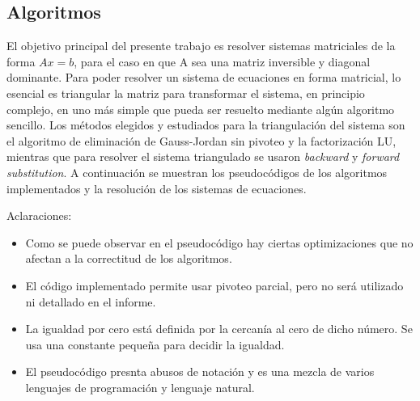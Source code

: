 \subsection{Algoritmos}

El objetivo principal del presente trabajo es resolver sistemas matriciales de la forma $Ax = b$, para el caso en que A sea una matriz inversible y diagonal dominante. Para poder resolver un sistema de ecuaciones en forma matricial, lo esencial es triangular la matriz para transformar el sistema, en principio complejo, en uno más simple que pueda ser resuelto mediante algún algoritmo sencillo.
Los métodos elegidos y estudiados para la triangulación del sistema son el algoritmo de eliminación de Gauss-Jordan sin pivoteo y la factorización LU, mientras que para resolver el sistema triangulado se usaron \emph{backward} y \emph{forward} \emph{substitution}. A continuación se muestran los pseudocódigos de los algoritmos implementados y la resolución de los sistemas de ecuaciones.



Aclaraciones:
\begin{itemize}
\item Como se puede observar en el pseudocódigo hay ciertas optimizaciones que no afectan a la correctitud de los algoritmos.
\item El código implementado permite usar pivoteo parcial, pero no será utilizado ni detallado en el informe.
\item La igualdad por cero está definida por la cercanía al cero de dicho número. Se usa una constante pequeña para decidir la igualdad.
\item El pseudocódigo presnta abusos de notación y es una mezcla de varios lenguajes de programación y lenguaje natural.
\end{itemize}







